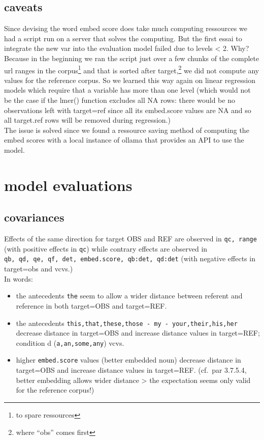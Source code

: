 \documentclass[
  12pt,
  oneside]{book}
\providecommand{\tightlist}{%
  \setlength{\itemsep}{0pt}\setlength{\parskip}{0pt}}
\begin{document}
\subsection{caveats}\label{caveats}

Since devising the word embed score does take much computing ressources we had a script run on a server that solves the computing. But the first essai to integrate the new var into the evaluation model failed due to levels \textless{} 2. Why? Because in the beginning we ran the script just over a few chunks of the complete url ranges in the corpus\footnote{to spare ressources} and that is sorted after target,\footnote{where ``obs'' comes first} we did not compute any values for the reference corpus. So we learned this way again on linear regression models which require that a variable has more than one level (which would not be the case if the lmer() function excludes all NA rows: there would be no observations left with target=ref since all its embed.score values are NA and so all target.ref rows will be removed during regression.)\\
The issue is solved since we found a ressource saving method of computing the embed scores with a local instance of ollama that provides an API to use the model.

\section{model evaluations}\label{model-evaluations}

\subsection{covariances}\label{covariances}

Effects of the same direction for target OBS and REF are observed in \texttt{qc,\ range} (with positive effects in \texttt{qc}) while contrary effects are observed in \texttt{qb,\ qd,\ qe,\ qf,\ det,\ embed.score,\ qb:det,\ qd:det} (with negative effects in target=obs and vcvs.)\\
In words:

\begin{itemize}
\tightlist
\item
  the antecedents \texttt{the} seem to allow a wider distance between referent and reference in both target=OBS and target=REF.
\item
  the antecedents \texttt{this,that,these,those\ -\ my\ -\ your,their,his,her} decrease distance in target=OBS and increase distance values in target=REF; condition d (\texttt{a,an,some,any}) vcvs.\\
\item
  higher \texttt{embed.score} values (better embedded noun) decrease distance in target=OBS and increase distance values in target=REF. (cf.~par 3.7.5.4, better embedding allows wider distance \textgreater{} the expectation seems only valid for the reference corpus!)
\end{itemize}
\end{document}
